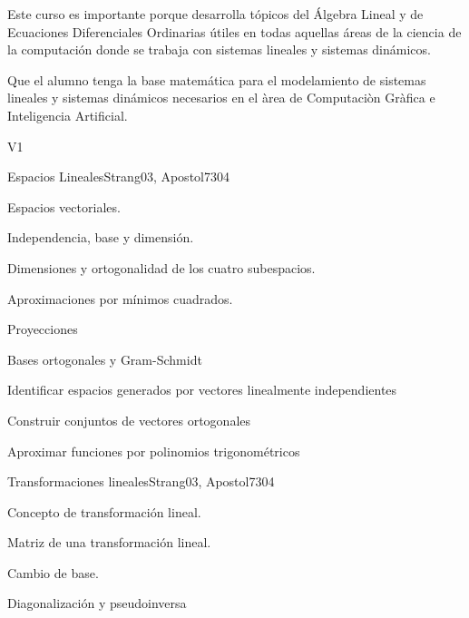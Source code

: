 \begin{syllabus}


\begin{justification}
Este curso es importante porque desarrolla tópicos del Álgebra Lineal y de Ecuaciones Diferenciales Ordinarias útiles en todas aquellas áreas de la ciencia de la computación donde se trabaja con sistemas lineales y sistemas dinámicos.
\end{justification}

\begin{goals}
\item Que el alumno tenga la base matemática para el modelamiento de sistemas lineales y sistemas dinámicos necesarios en el àrea de Computaciòn Gràfica e Inteligencia Artificial.
\end{goals}

\begin{outcomes}{V1}
\end{outcomes}

\begin{unit}{Espacios Lineales}{}{Strang03, Apostol73}{0}{4}
\begin{topics}
      \item Espacios vectoriales.
      \item Independencia, base y dimensión.
      \item Dimensiones y ortogonalidad de los cuatro subespacios.
      \item Aproximaciones por mínimos cuadrados.
      \item Proyecciones
      \item Bases ortogonales y Gram-Schmidt
   \end{topics}

   \begin{learningoutcomes}
      \item Identificar espacios generados por vectores linealmente independientes
      \item Construir conjuntos de vectores ortogonales
      \item Aproximar funciones por polinomios trigonométricos
   \end{learningoutcomes}
\end{unit}

\begin{unit}{Transformaciones lineales}{}{Strang03, Apostol73}{0}{4}
\begin{topics}
      \item Concepto de transformación lineal.
      \item Matriz de una transformación lineal.
      \item Cambio de base.
      \item Diagonalización y pseudoinversa
   \end{topics}


\end{unit}
\end{syllabus}
